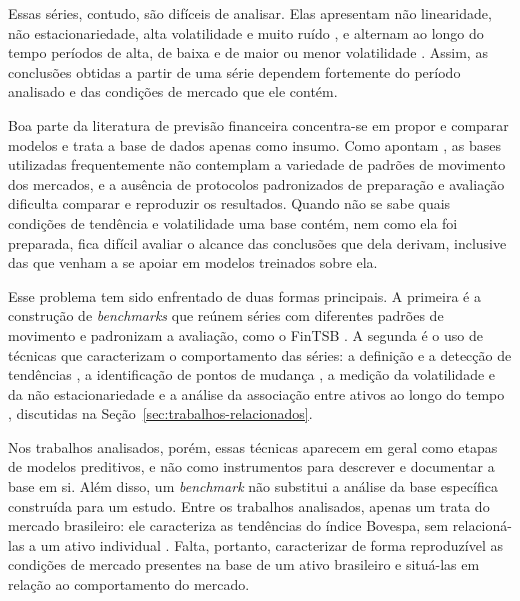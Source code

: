 \documentclass[12pt,a4paper]{article}
\begin{document}
Essas séries, contudo, são difíceis de analisar. Elas apresentam não linearidade, não estacionariedade, alta volatilidade e muito ruído \parencite{li_accurate_2024, sun_novel_2024}, e alternam ao longo do tempo períodos de alta, de baixa e de maior ou menor volatilidade \parencite{hu_fintsb_2025}. Assim, as conclusões obtidas a partir de uma série dependem fortemente do período analisado e das condições de mercado que ele contém.

Boa parte da literatura de previsão financeira concentra-se em propor e comparar modelos e trata a base de dados apenas como insumo. Como apontam \textcite{hu_fintsb_2025}, as bases utilizadas frequentemente não contemplam a variedade de padrões de movimento dos mercados, e a ausência de protocolos padronizados de preparação e avaliação dificulta comparar e reproduzir os resultados. Quando não se sabe quais condições de tendência e volatilidade uma base contém, nem como ela foi preparada, fica difícil avaliar o alcance das conclusões que dela derivam, inclusive das que venham a se apoiar em modelos treinados sobre ela.

Esse problema tem sido enfrentado de duas formas principais. A primeira é a construção de \textit{benchmarks} que reúnem séries com diferentes padrões de movimento e padronizam a avaliação, como o FinTSB \parencite{hu_fintsb_2025}. A segunda é o uso de técnicas que caracterizam o comportamento das séries: a definição e a detecção de tendências \parencite{miot_empirical_2020, hosseini_pattern-based_2025, anghinoni_time_2019}, a identificação de pontos de mudança \parencite{wan_tcdformer_2024}, a medição da volatilidade e da não estacionariedade \parencite{biswas_dual_2025, anbaee_farimani_adaptive_2024} e a análise da associação entre ativos ao longo do tempo \parencite{luo_short-term_2024}, discutidas na Seção~\ref{sec:trabalhos-relacionados}.

Nos trabalhos analisados, porém, essas técnicas aparecem em geral como etapas de modelos preditivos, e não como instrumentos para descrever e documentar a base em si. Além disso, um \textit{benchmark} não substitui a análise da base específica construída para um estudo. Entre os trabalhos analisados, apenas um trata do mercado brasileiro: ele caracteriza as tendências do índice Bovespa, sem relacioná-las a um ativo individual \parencite{anghinoni_time_2019}. Falta, portanto, caracterizar de forma reproduzível as condições de mercado presentes na base de um ativo brasileiro e situá-las em relação ao comportamento do mercado.
\end{document}
